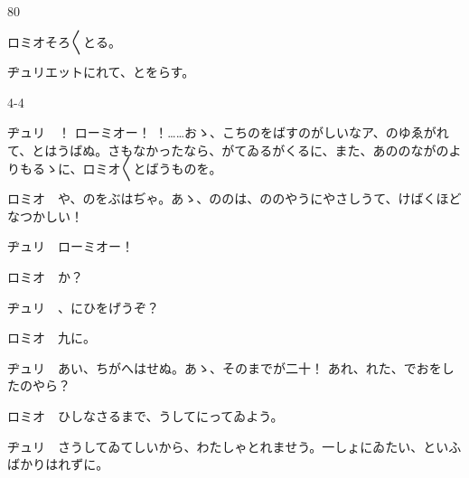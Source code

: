 \documentclass[tate,paper=b6j,jafontsize=9pt]{jlreq}
\begin{document}
\begin{azconvIndented}{8\zw}{0\zw}

ロミオそろ{〳〵}とる。

ヂュリエットにれて、とをらす。

\end{azconvIndented}
\begin{azconvIndented}{4\zw}{-4\zw}

ヂュリ　！ ローミオー！ ！……おゝ、こちのをばすのがしいなア、のゆゑがれて、とはうばぬ。さもなかったなら、がてゐるがくるに、また、あののながのよりもるゝに、ロミオ{〳〵}とばうものを。

ロミオ　や、のをぶはぢゃ。あゝ、ののは、ののやうにやさしうて、けばくほどなつかしい！

ヂュリ　ローミオー！

ロミオ　か？

ヂュリ　、にひをげうぞ？

ロミオ　九に。

ヂュリ　あい、ちがへはせぬ。あゝ、そのまでが二十！ あれ、れた、でおをしたのやら？

ロミオ　ひしなさるまで、うしてにってゐよう。

ヂュリ　さうしてゐてしいから、わたしゃとれませう。一しょにゐたい、といふばかりはれずに。


\end{azconvIndented}
\end{document}
